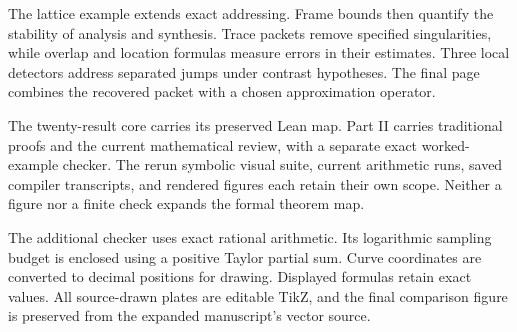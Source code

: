 \documentclass[11pt,letterpaper]{article}
\newcommand{\head}[1]{\par\vspace{2pt}{\sffamily\bfseries\normalsize #1}\par\vspace{1pt}}
\begin{document}
\head{A connected route}
The lattice example extends exact addressing. Frame bounds then quantify the
stability of analysis and synthesis. Trace packets remove specified singularities,
while overlap and location formulas measure errors in their estimates. Three
local detectors address separated jumps under contrast hypotheses. The final
page combines the recovered packet with a chosen approximation operator.
\head{Keep the evidence attached to its claim}
The twenty-result core carries its preserved Lean map. Part II carries
traditional proofs and the current mathematical review, with a separate exact
worked-example checker. The rerun symbolic visual suite, current arithmetic
runs, saved compiler transcripts, and rendered figures each retain their own
scope. Neither a figure nor a finite check expands the formal theorem map.
\head{What the example numbers mean}
The additional checker uses exact rational arithmetic. Its logarithmic sampling
budget is enclosed using a positive Taylor partial sum. Curve coordinates are
converted to decimal positions for drawing. Displayed formulas retain exact
values. All source-drawn plates are editable TikZ, and the final comparison
figure is preserved from the expanded manuscript's vector source.

\clearpage
{}
\begingroup
{}\fontsize{10}{12}\selectfont
\setlength{\parskip}{3pt}\setlength{\abovedisplayskip}{6pt}\setlength{\belowdisplayskip}{6pt}

\endgroup
\end{document}
